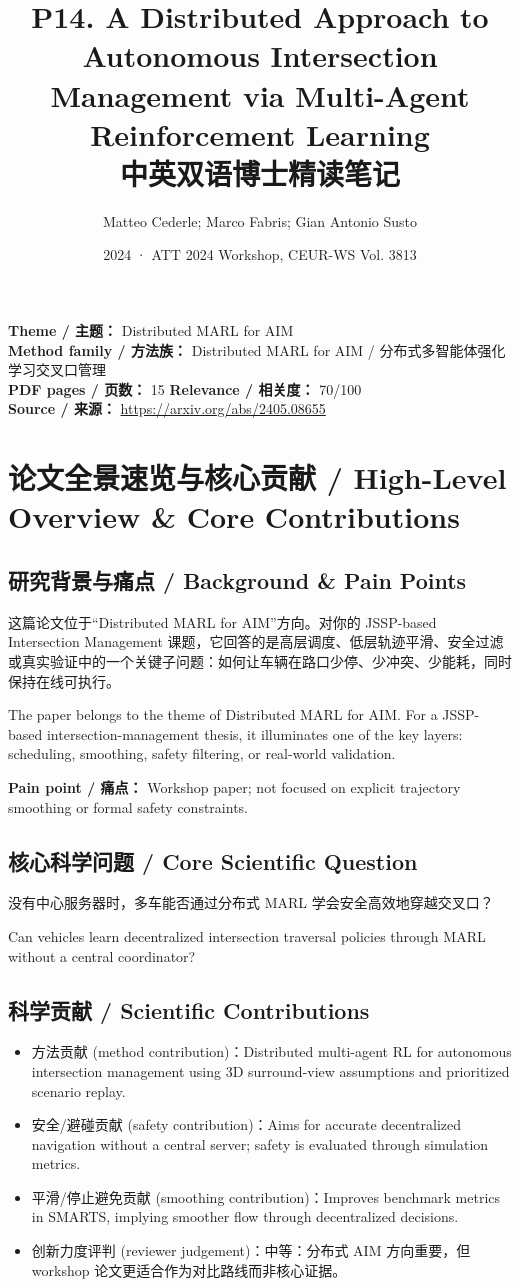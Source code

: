 \documentclass[UTF8,a4paper,11pt,fontset=fandol]{ctexart}
\title{P14. A Distributed Approach to Autonomous Intersection Management via Multi-Agent Reinforcement Learning\\中英双语博士精读笔记}
\author{Matteo Cederle; Marco Fabris; Gian Antonio Susto}
\date{2024 · ATT 2024 Workshop, CEUR-WS Vol. 3813}
\begin{document}
\maketitle

\noindent\textbf{Theme / 主题：} Distributed MARL for AIM\\
\textbf{Method family / 方法族：} Distributed MARL for AIM / 分布式多智能体强化学习交叉口管理\\
\textbf{PDF pages / 页数：} 15 \quad
\textbf{Relevance / 相关度：} 70/100\\
\textbf{Source / 来源：} \url{https://arxiv.org/abs/2405.08655}

\section{论文全景速览与核心贡献 / High-Level Overview \& Core Contributions}
\subsection{研究背景与痛点 / Background \& Pain Points}
这篇论文位于“Distributed MARL for AIM”方向。对你的 JSSP-based Intersection Management 课题，它回答的是高层调度、低层轨迹平滑、安全过滤或真实验证中的一个关键子问题：如何让车辆在路口少停、少冲突、少能耗，同时保持在线可执行。

The paper belongs to the theme of Distributed MARL for AIM. For a JSSP-based intersection-management thesis, it illuminates one of the key layers: scheduling, smoothing, safety filtering, or real-world validation.

\textbf{Pain point / 痛点：} Workshop paper; not focused on explicit trajectory smoothing or formal safety constraints.

\subsection{核心科学问题 / Core Scientific Question}
没有中心服务器时，多车能否通过分布式 MARL 学会安全高效地穿越交叉口？

Can vehicles learn decentralized intersection traversal policies through MARL without a central coordinator?

\subsection{科学贡献 / Scientific Contributions}
\begin{itemize}
\item 方法贡献 (method contribution)：Distributed multi-agent RL for autonomous intersection management using 3D surround-view assumptions and prioritized scenario replay.
\item 安全/避碰贡献 (safety contribution)：Aims for accurate decentralized navigation without a central server; safety is evaluated through simulation metrics.
\item 平滑/停止避免贡献 (smoothing contribution)：Improves benchmark metrics in SMARTS, implying smoother flow through decentralized decisions.
\item 创新力度评判 (reviewer judgement)：中等：分布式 AIM 方向重要，但 workshop 论文更适合作为对比路线而非核心证据。
\end{itemize}
\end{document}
